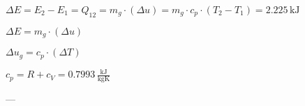 \( \Delta E = E_2 - E_1 = Q_{12} = m_g \cdot (\Delta u) = m_g \cdot c_p \cdot (T_2 - T_1) = 2.225 \, \text{kJ} \)  

\( \Delta E = m_g \cdot (\Delta u) \)  

\( \Delta u_g = c_p \cdot (\Delta T) \)  

\( c_p = R + c_V = 0.7993 \, \frac{\text{kJ}}{\text{kgK}} \)  

---